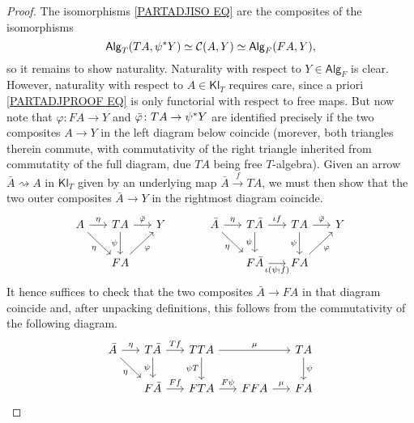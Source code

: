 \documentclass[a4paper,10pt
,draft
]{article}%
\numberwithin{equation}{section}
\numberwithin{figure}{section}
\theoremstyle{definition} %
\newcommand{\Alg}{\mathsf{Alg}}
\newcommand{\Kl}{\mathsf{Kl}}
\newcommand{\1}{\ensuremath{\mathbbm 1}}%
\begin{document}
\begin{proof}
The isomorphisms \eqref{PARTADJISO EQ} are the composites of the isomorphisms
\begin{equation}\label{PARTADJPROOF EQ}
	\mathsf{Alg}_T(T A, \psi^{\**} Y) \simeq
	\mathcal{C}(A,Y) \simeq
	\mathsf{Alg}_F(FA,Y),
\end{equation}
so it remains to show naturality.
Naturality with respect to $Y \in \Alg_F$ is clear.
However, naturality with respect to $A \in \Kl_T$
requires care, since a priori \eqref{PARTADJPROOF EQ}
is only functorial with respect to free maps.
But now note that 
$\varphi \colon FA \to Y$
and 
$\bar{\varphi} \colon TA \to \psi^{\**} Y$
are identified precisely if the two composites
$A \to Y$ in the left diagram below coincide (morever, both triangles therein commute, with commutativity of the right triangle
inherited from commutatity of the full diagram, due $TA$ being free $T$-algebra).
Given an arrow $\bar{A} \rightsquigarrow A$ in $\Kl_T$
given by an underlying map $\bar{A} \xrightarrow{f} TA$, 
we must then show that the two outer composites
$\bar{A} \to Y$ in the rightmost diagram coincide.
\begin{equation}\label{ADJOINTCORR EQ}
\begin{tikzcd}[column sep = 1.55em]
	A \ar{r}{\eta} \ar{rd}[swap]{\eta}
&
	T A \ar{r}{\bar{\varphi}} \ar{d}[swap]{\psi}
&
	Y 
&&%
	\bar{A} \ar{r}{\eta} \ar{rd}[swap]{\eta}
&
	T \bar{A} \ar{r}{\iota f} \ar{d}[swap]{\psi}
&
	T A \ar{r}{\bar{\varphi}} \ar{d}[swap]{\psi}
&
	Y 
\\
&
	FA \ar{ru}[swap]{\varphi}
&
&&%
&
	F \bar{A} \ar{r}[swap]{\iota (\psi_! f)}
&
	FA \ar{ru}[swap]{\varphi}
&
\end{tikzcd}
\end{equation}
It hence suffices to check that the two composites
$\bar{A} \to FA$ in that diagram coincide and, after unpacking definitions, this follows from the commutativity of the following diagram.
\begin{equation}
\begin{tikzcd}[column sep = 1.55em]
	\bar{A} \ar{r}{\eta} \ar{rd}[swap]{\eta} 
&
	T\bar{A} \ar{r}{Tf} \ar{d}[swap]{\psi}
&
	TTA \ar{rr}{\mu}  \ar{d}[swap]{\psi T}
&&
	TA \ar{d}{\psi}
\\
&
	F \bar{A} \ar{r}{Ff}
&
	FTA \ar{r}{F\psi}
&
	FFA \ar{r}{\mu}
&
	FA
\end{tikzcd}
\end{equation}
\end{proof}
\end{document}
